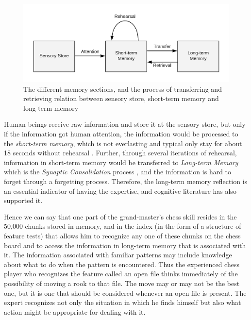 \begin{figure}
\includegraphics[width = 1\columnwidth]{memory_store.png}
\centering
\caption{The different memory sections, and the process of transferring and retrieving relation between sensory store, short-term memory and long-term memory}
\label{memoryStore}
\end{figure}

Human beings receive raw information and store it at the sensory store, but only if the information got human attention, the information would be processed to the \textit{short-term memory}, which is not everlasting and typical only stay for about 18 seconds without rehearsal \cite{revlin2012cognition}. Further, through several iterations of rehearsal, information in short-term memory would be transferred to \textit{Long-term Memory} which is the \textit{Synaptic Consolidation} process \cite{dudai2004memory}, and the information is hard to forget through a forgetting process. Therefore, the long-term memory reflection is an essential indicator of having the expertise, and cognitive literature has also supported it. 

\begin{displayquote}
Hence we can say that one part of the grand-master's chess skill resides in the 50,000 chunks stored in memory, and in the index (in the form of a structure of feature tests) that allows him to recognize any one of these chunks on the chess board and to access the information in long-term memory that is associated with it. The information associated with familiar patterns may include knowledge about what to do when the pattern is encountered. Thus the experienced chess player who recognizes the feature called an open file thinks immediately of the possibility of moving a rook to that file. The move may or may not be the best one, but it is one that should be considered whenever an open file is present. The expert recognizes not only the situation in which he finds himself but also what action might be appropriate for dealing with it.
\end{displayquote}


